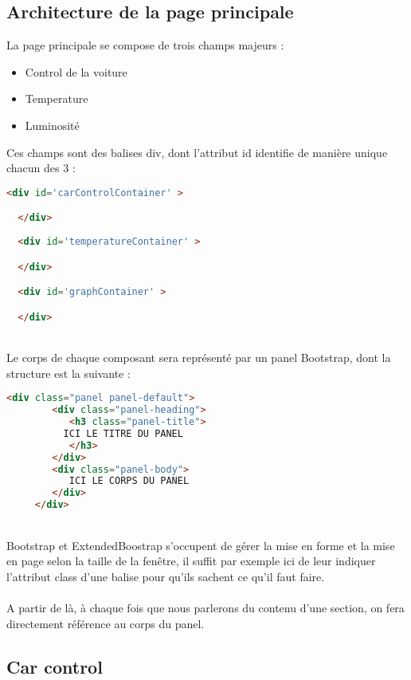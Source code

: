 \subsection{Architecture de la page principale}

La page principale se compose de trois champs majeurs :
\begin{itemize}
\item Control de la voiture
\item Temperature
\item Luminosité
\end{itemize}

Ces champs sont des balises div, dont l’attribut id identifie de manière unique chacun des 3 :\\
\begin{DDbox}{\linewidth}
\begin{lstlisting}[language=html]
  <div id='carControlContainer' >

  </div>
  
  <div id='temperatureContainer' >

  </div>

  <div id='graphContainer' >

  </div>
\end{lstlisting}
\end{DDbox}
\\
Le corps de chaque composant sera représenté par un panel Bootstrap, dont la structure est la suivante :\\
\begin{DDbox}{\linewidth}
\begin{lstlisting}[language=html]
  <div class="panel panel-default">
	    <div class="panel-heading">
	       <h3 class="panel-title">
		  ICI LE TITRE DU PANEL
	       </h3>
	    </div>
	    <div class="panel-body">
	       ICI LE CORPS DU PANEL
	    </div>
	 </div>
\end{lstlisting}
\end{DDbox}
\\
Bootstrap et ExtendedBoostrap s'occupent de gérer la mise en forme et la mise en page selon la taille de la fenêtre, il suffit par exemple ici de leur indiquer l'attribut class d'une balise pour qu'ils sachent ce qu'il faut faire.
\\
\\
A partir de là, à chaque fois que nous parlerons du contenu d'une section, on fera directement référence au corps du panel.

\subsection{Car control}

